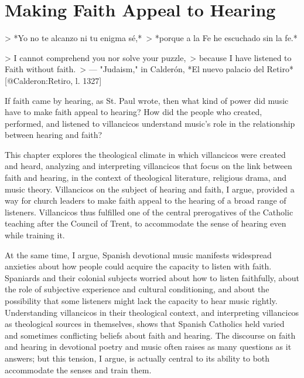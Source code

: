 
% 
% 
% 


\chapter{Making Faith Appeal to Hearing}
\label{ch:faith-hearing}

> *Yo no te alcanzo ni tu enigma sé,*\
> *porque a la Fe he escuchado sin la fe.* 

> I cannot comprehend you nor solve your puzzle,\
> because I have listened to Faith without faith.\
> --- "Judaism," in Calderón, *El nuevo palacio del Retiro*
[@Calderon:Retiro, l. 1327] %

If faith came by hearing, as St. Paul wrote, then what kind of power did music
have to make faith appeal to hearing?
How did the people who created, performed, and listened to villancicos
understand music's role in the relationship between hearing and faith?

This chapter explores the theological climate in which villancicos were created
and heard, analyzing and interpreting villancicos that focus on the link between
faith and hearing, in the context of theological literature, religious drama,
and music theory. 
Villancicos on the subject of hearing and faith, I argue, provided a way for
church leaders to make faith appeal to the hearing of a broad range of
listeners.
Villancicos thus fulfilled one of the central prerogatives of the Catholic
teaching after the Council of Trent, to accommodate the sense of hearing even
while training it. 

At the same time, I argue, Spanish devotional music manifests widespread
anxieties about how people could acquire the capacity to listen with faith.
Spaniards and their colonial subjects worried about how to listen faithfully,
about the role of subjective experience and cultural conditioning, and about the
possibility that some listeners might lack the capacity to hear music rightly.
Understanding villancicos in their theological context, and interpreting
villancicos as theological sources in themselves, shows that Spanish Catholics
held varied and sometimes conflicting beliefs about faith and hearing. 
The discourse on faith and hearing in devotional poetry and music often raises
as many questions as it answers; but this tension, I argue, is actually central
to its ability to both accommodate the senses and train them. 

